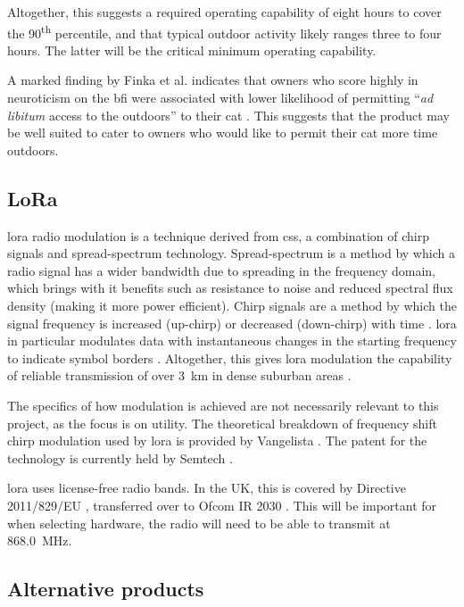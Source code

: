 Altogether, this suggests a required operating capability of eight hours to cover the 90\textsuperscript{th}
percentile, and that typical outdoor activity likely ranges three to four hours. The latter will be 
the critical minimum operating capability. 

A marked finding by Finka et al. indicates that owners who score highly in neuroticism 
on the \gls{bfi} were associated with lower likelihood of permitting ``\textit{ad libitum} 
access to the outdoors'' to their cat \cite{finka2019}. This suggests that the product may be well suited 
to cater to owners who would like to permit their cat more time outdoors. 

\subsection{LoRa}
\gls{lora} radio modulation is a technique derived from \acrshort{css}, 
a combination of chirp signals and spread-spectrum technology. 
Spread-spectrum is a method by which a radio signal has a wider bandwidth 
due to spreading in the frequency domain, which brings with it 
benefits such as resistance to noise and reduced spectral flux density (making 
it more power efficient). Chirp signals are a method by which the 
signal frequency is increased (up-chirp) or decreased (down-chirp) with time \cite{Loukatos2022}. 
\gls{lora} in particular modulates data with instantaneous changes in the starting
frequency to indicate symbol borders \cite{liando2019}. 
Altogether, this gives \gls{lora} modulation the capability of reliable 
transmission of over \qty{3}{\km} in dense suburban areas \cite{augustin:lora}.

The specifics of how modulation is achieved are not necessarily relevant to this project,
as the focus is on utility. The theoretical breakdown of frequency shift chirp modulation 
used by \gls{lora} is provided by Vangelista \cite{vangelista2017}. The patent 
for the technology is currently held by Semtech \cite{patent:lora}.

\gls{lora} uses license-free radio bands. In the UK, this is covered by 
Directive 2011/829/EU \cite{eu:directive}, transferred over to 
Ofcom IR 2030 \cite{ofcom:licenceexempt}. This will be important 
for when selecting hardware, the radio will need to be able 
to transmit at \qty{868.0}{\MHz}.

\subsection{Alternative products}


